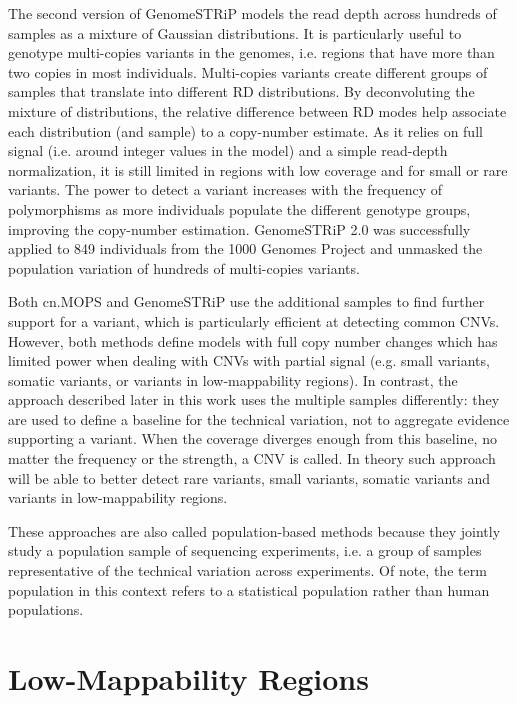 The second version of {\sf GenomeSTRiP} models the read depth across hundreds of samples as a mixture of Gaussian distributions\cite{Handsaker2015}.
It is particularly useful to genotype multi-copies variants in the genomes, i.e. regions that have more than two copies in most individuals.
Multi-copies variants create different groups of samples that translate into different RD distributions.
By deconvoluting the mixture of distributions, the relative difference between RD modes help associate each distribution (and sample) to a copy-number estimate.
As it relies on full signal (i.e. around integer values in the model) and a simple read-depth normalization, it is still limited in regions with low coverage and for small or rare variants.
The power to detect a variant increases with the frequency of polymorphisms as more individuals populate the different genotype groups, improving the copy-number estimation.
{\sf GenomeSTRiP 2.0} was successfully applied to 849 individuals from the 1000 Genomes Project and unmasked the population variation of hundreds of multi-copies variants.

Both {\sf cn.MOPS} and {\sf GenomeSTRiP} use the additional samples to find further support for a variant, which is particularly efficient at detecting common CNVs.
However, both methods define models with full copy number changes which has limited power when dealing with CNVs with partial signal (e.g. small variants, somatic variants, or variants in low-mappability regions).
In contrast, the approach described later in this work uses the multiple samples differently: they are used to define a baseline for the technical variation, not to aggregate evidence supporting a variant.
When the coverage diverges enough from this baseline, no matter the frequency or the strength, a CNV is called.
In theory such approach will be able to better detect rare variants, small variants, somatic variants and variants in low-mappability regions.

These approaches are also called population-based methods because they jointly study a population sample of sequencing experiments, i.e. a group of samples representative of the technical variation across experiments\cite{Handsaker2015}.
Of note, the term population in this context refers to a statistical population rather than human populations.

\section{Low-Mappability Regions} 
\label{intro:map}

